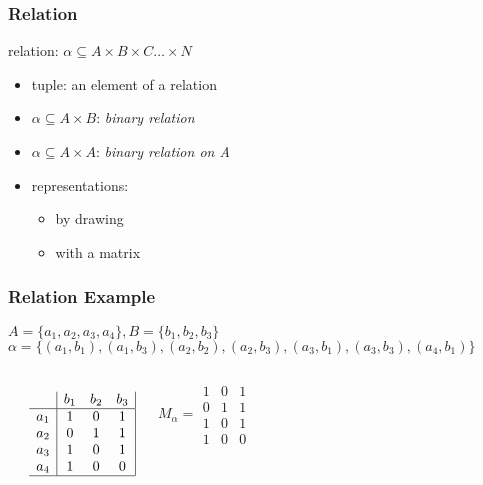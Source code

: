 \documentclass[dvipsnames]{beamer}
\begin{document}
\begin{frame}
  \frametitle{Relation}

  \begin{definition}
    \alert{relation}: $\alpha \subseteq A \times B \times C \dots \times N$
  \end{definition}

  \pause
  \begin{itemize}
    \item \alert{tuple}: an element of a relation

    \pause
    \medskip
    \item $\alpha \subseteq A \times B$: \emph{binary relation}
    \item  $\alpha \subseteq A \times A$: \emph{binary relation on A}

    \pause
    \medskip
    \item representations:
    \begin{itemize}
      \item by drawing
      \item with a matrix
    \end{itemize}
  \end{itemize}
\end{frame}

\begin{frame}
  \frametitle{Relation Example}

  \begin{example}
    $A=\{a_1,a_2,a_3,a_4\}, B=\{b_1,b_2,b_3\}$\\
    $\alpha = \{(a_1,b_1),(a_1,b_3),(a_2,b_2),(a_2,b_3),
                (a_3,b_1),(a_3,b_3),(a_4,b_1)\}$

    \pause
    \medskip
    \begin{columns}
      \begin{center}
      \end{center}

      \[ \begin{array}{c|ccc|}
              & b_1 & b_2 & b_3\\\hline
          a_1 &  1  &  0  &  1\\
          a_2 &  0  &  1  &  1\\
          a_3 &  1  &  0  &  1\\
          a_4 &  1  &  0  &  0\\\hline
        \end{array} \]

      \[ M_\alpha =
        \begin{array}{|ccc|}
          1 & 0 & 1\\
          0 & 1 & 1\\
          1 & 0 & 1\\
          1 & 0 & 0
        \end{array}
      \]
    \end{columns}
  \end{example}
\end{frame}
\end{document}
